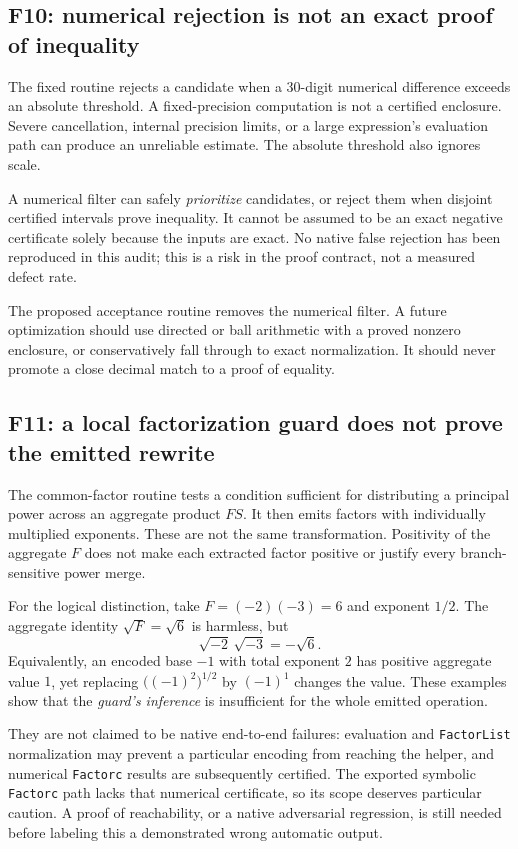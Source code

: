 \documentclass[11pt,letterpaper]{article}
\newcommand{\code}[1]{\texttt{#1}}
\theoremstyle{definition}
\begin{document}
\subsection{F10: numerical rejection is not an exact proof of inequality}

The fixed routine rejects a candidate when a 30-digit numerical difference exceeds an absolute threshold. A fixed-precision computation is not a certified enclosure. Severe cancellation, internal precision limits, or a large expression's evaluation path can produce an unreliable estimate. The absolute threshold also ignores scale.

A numerical filter can safely \emph{prioritize} candidates, or reject them when disjoint certified intervals prove inequality. It cannot be assumed to be an exact negative certificate solely because the inputs are exact. No native false rejection has been reproduced in this audit; this is a risk in the proof contract, not a measured defect rate.

The proposed acceptance routine removes the numerical filter. A future optimization should use directed or ball arithmetic with a proved nonzero enclosure, or conservatively fall through to exact normalization. It should never promote a close decimal match to a proof of equality.

\subsection{F11: a local factorization guard does not prove the emitted rewrite}

The common-factor routine tests a condition sufficient for distributing a principal power across an aggregate product $FS$. It then emits factors with individually multiplied exponents. These are not the same transformation. Positivity of the aggregate $F$ does not make each extracted factor positive or justify every branch-sensitive power merge.

For the logical distinction, take $F=(-2)(-3)=6$ and exponent $1/2$. The aggregate identity $\sqrt{F}=\sqrt6$ is harmless, but
\[
 \sqrt{-2}\,\sqrt{-3}=-\sqrt6.
\]
Equivalently, an encoded base $-1$ with total exponent $2$ has positive aggregate value $1$, yet replacing $\bigl((-1)^2\bigr)^{1/2}$ by $(-1)^1$ changes the value. These examples show that the \emph{guard's inference} is insufficient for the whole emitted operation.

They are not claimed to be native end-to-end failures: evaluation and \code{FactorList} normalization may prevent a particular encoding from reaching the helper, and numerical \code{Factorc} results are subsequently certified. The exported symbolic \code{Factorc} path lacks that numerical certificate, so its scope deserves particular caution. A proof of reachability, or a native adversarial regression, is still needed before labeling this a demonstrated wrong automatic output.
\end{document}
